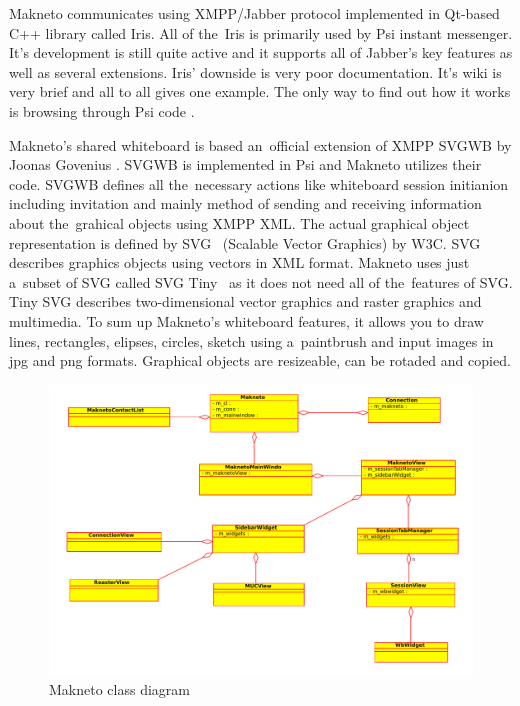 Makneto communicates using XMPP/Jabber protocol implemented in Qt-based C++ library called Iris. All of the~Iris is primarily used by Psi instant messenger. It's development is still quite active and it supports all of Jabber's key features as well as several extensions. Iris' downside is very poor documentation. It's wiki is very brief and all to all gives one example. The only way to find out how it works is browsing through Psi code \cite{irisWiki}.

Makneto's shared whiteboard is based an~official extension of XMPP SVGWB by Joonas Govenius \cite{SVGWB}. SVGWB is implemented in Psi and Makneto utilizes their code. SVGWB defines all the~necessary actions like whiteboard session initianion including invitation and mainly method of sending and receiving information about the~grahical objects using XMPP XML. The actual graphical object representation is defined by SVG~\cite{SVG} (Scalable Vector Graphics) by W3C. SVG describes graphics objects using vectors in XML format. Makneto uses just a~subset of SVG called SVG Tiny~\cite{SVGtiny} as it does not need all of the~features of SVG. Tiny SVG describes two-dimensional vector graphics and raster graphics and multimedia. To sum up Makneto's whiteboard features, it allows you to draw lines, rectangles, elipses, circles, sketch using a~paintbrush and input images in jpg and png formats. Graphical objects are resizeable, can be rotaded and copied.

\begin{figure}[ht]
\begin{center}
	\includegraphics[width=15cm]{fig/makneto-orig-class-diagram.pdf}
	\caption{Makneto class diagram}
	\label{fig:makneto-original-class-diagram}
\end{center}
\end{figure}

